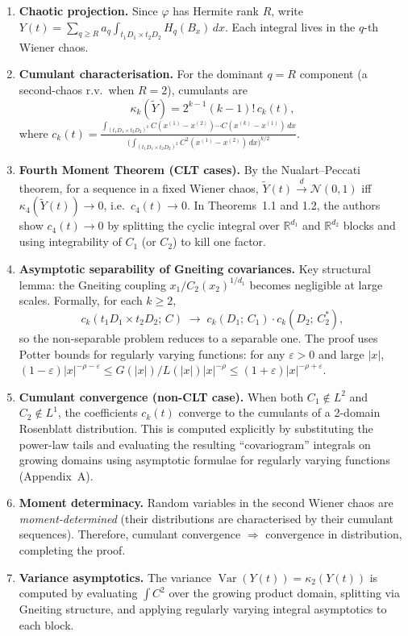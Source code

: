 \documentclass[11pt,a4paper]{article}
\begin{document}
\begin{enumerate}[label=\textbf{Step \arabic*.}, leftmargin=*]

\item \textbf{Chaotic projection.}
Since $\varphi$ has Hermite rank $R$, write
$Y(t) = \sum_{q \ge R} a_q \int_{t_1 D_1 \times t_2 D_2} H_q(B_x)\,dx$.
Each integral lives in the $q$-th Wiener chaos.

\item \textbf{Cumulant characterisation.}
For the dominant $q = R$ component (a second-chaos r.v.\ when $R=2$), cumulants are
\[
\kappa_k(\widetilde{Y}) = 2^{k-1}(k-1)!\,c_k(t),
\]
where
$c_k(t) = \frac{\int_{(t_1 D_1 \times t_2 D_2)^k} C(x^{(1)}-x^{(2)})\cdots C(x^{(k)}-x^{(1)})\,dx}{\bigl(\int_{(t_1 D_1 \times t_2 D_2)^2} C^2(x^{(1)}-x^{(2)})\,dx\bigr)^{k/2}}$.

\item \textbf{Fourth Moment Theorem (CLT cases).}
By the Nualart--Peccati theorem, for a sequence in a fixed Wiener chaos, $\widetilde{Y}(t) \xrightarrow{d} \mathcal{N}(0,1)$ iff $\kappa_4(\widetilde{Y}(t)) \to 0$, i.e.\ $c_4(t) \to 0$.
In Theorems~1.1 and 1.2, the authors show $c_4(t) \to 0$ by splitting the cyclic integral over $\mathbb{R}^{d_1}$ and $\mathbb{R}^{d_2}$ blocks and using integrability of $C_1$ (or $C_2$) to kill one factor.

\item \textbf{Asymptotic separability of Gneiting covariances.}
Key structural lemma: the Gneiting coupling $x_1 / C_2(x_2)^{1/d_1}$ becomes negligible at large scales.
Formally, for each $k \ge 2$,
\[
c_k(t_1 D_1 \times t_2 D_2;\, C) \;\longrightarrow\; c_k(D_1;\, C_1)\cdot c_k(D_2;\, C_2^*),
\]
so the non-separable problem reduces to a separable one.
The proof uses Potter bounds for regularly varying functions: for any $\varepsilon > 0$ and large $|x|$,
$(1-\varepsilon)|x|^{-\rho-\varepsilon} \le G(|x|)/L(|x|)|x|^{-\rho} \le (1+\varepsilon)|x|^{-\rho+\varepsilon}$.

\item \textbf{Cumulant convergence (non-CLT case).}
When both $C_1 \notin L^2$ and $C_2 \notin L^1$, the coefficients $c_k(t)$ converge to the cumulants of a 2-domain Rosenblatt distribution.
This is computed explicitly by substituting the power-law tails and evaluating the resulting ``covariogram'' integrals on growing domains using asymptotic formulae for regularly varying functions (Appendix~A).

\item \textbf{Moment determinacy.}
Random variables in the second Wiener chaos are \emph{moment-determined} (their distributions are characterised by their cumulant sequences).
Therefore, cumulant convergence $\Rightarrow$ convergence in distribution, completing the proof.

\item \textbf{Variance asymptotics.}
The variance $\operatorname{Var}(Y(t)) = \kappa_2(Y(t))$ is computed by evaluating $\int C^2$ over the growing product domain, splitting via Gneiting structure, and applying regularly varying integral asymptotics to each block.
\end{enumerate}
\end{document}
